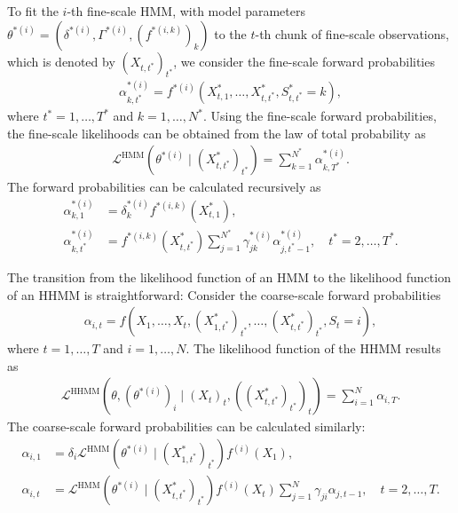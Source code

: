 \documentclass[article]{jss}
\begin{document}
To fit the $i$-th fine-scale HMM, with model parameters $\theta^{*(i)}=(\delta^{*(i)}, \Gamma^{*(i)},(f^{*(i,k)})_k)$ to the $t$-th chunk of fine-scale observations, which is denoted by $(X_{t,t^*})_{t^*}$, we consider the fine-scale forward probabilities 
\begin{align*}
\alpha^{*(i)}_{k,t^*}=f^{*(i)}(X^*_{t,1},\dots,X^*_{t,t^*}, S^*_{t,t^*}=k),
\end{align*}
where $t^*=1,\dots,T^*$ and $k=1,\dots,N^*$. Using the fine-scale forward probabilities, the fine-scale likelihoods can be obtained from the law of total probability as
\begin{align*}
\mathcal{L}^\text{HMM}(\theta^{*(i)}\mid (X^*_{t,t^*})_{t^*})=\sum_{k=1}^{N^*}\alpha^{*(i)}_{k,T^*}.
\end{align*}
The forward probabilities can be calculated recursively as
\begin{align*}
\alpha^{*(i)}_{k,1} &= \delta^{*(i)}_k f^{*(i,k)}(X^*_{t,1}), \\
\alpha^{*(i)}_{k,t^*} &= f^{*(i,k)}(X^*_{t,t^*})\sum_{j=1}^{N^*}\gamma^{*(i)}_{jk}\alpha^{*(i)}_{j,t^*-1}, \quad t^*=2,\dots,T^*.
\end{align*}

The transition from the likelihood function of an HMM to the likelihood function of an HHMM is straightforward: Consider the coarse-scale forward probabilities
\begin{align*}
\alpha_{i,t}=f(X_1,\dots,X_t,(X^*_{1,t^*})_{t^*},\dots,(X^*_{t,t^*})_{t^*}, S_t=i),
\end{align*}
where $t=1,\dots,T$ and $i=1,\dots,N$. The likelihood function of the HHMM results as
\begin{align*}
\mathcal{L}^\text{HHMM}(\theta,(\theta^{*(i)})_i\mid (X_t)_t,((X^*_{t,t^*})_{t^*})_t)=\sum_{i=1}^{N}\alpha_{i,T}.
\end{align*}
The coarse-scale forward probabilities can be calculated similarly:
\begin{align*}
\alpha_{i,1} &= \delta_i \mathcal{L}^\text{HMM}(\theta^{*(i)}\mid (X^*_{1,t^*})_{t^*})f^{(i)}(X_1), \\
\alpha_{i,t} &= \mathcal{L}^\text{HMM}(\theta^{*(i)}\mid (X^*_{t,t^*})_{t^*}) f^{(i)}(X_t)\sum_{j=1}^{N}\gamma_{ji}\alpha_{j,t-1}, \quad t=2,\dots,T.
\end{align*}
\end{document}

